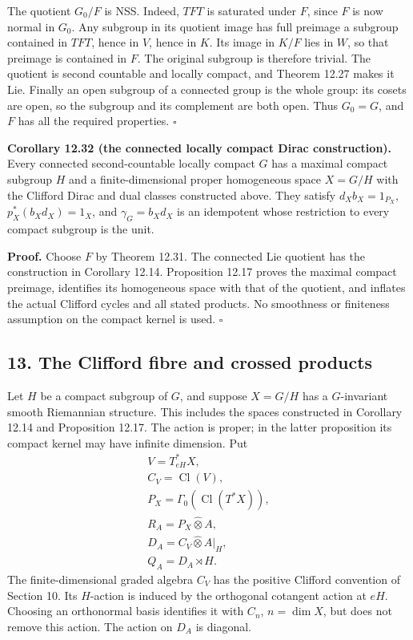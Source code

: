 \documentclass[
  11pt,
]{article}
\begin{document}
The quotient \(G_0/F\) is NSS. Indeed, \(TFT\) is saturated under \(F\),
since \(F\) is now normal in \(G_0\). Any subgroup in its quotient image
has full preimage a subgroup contained in \(TFT\), hence in \(V\), hence
in \(K\). Its image in \(K/F\) lies in \(W\), so that preimage is
contained in \(F\). The original subgroup is therefore trivial. The
quotient is second countable and locally compact, and Theorem 12.27
makes it Lie. Finally an open subgroup of a connected group is the whole
group: its cosets are open, so the subgroup and its complement are both
open. Thus \(G_0=G\), and \(F\) has all the required properties.
\(\square\)

\textbf{Corollary 12.32 (the connected locally compact Dirac
construction).} Every connected second-countable locally compact \(G\)
has a maximal compact subgroup \(H\) and a finite-dimensional proper
homogeneous space \(X=G/H\) with the Clifford Dirac and dual classes
constructed above. They satisfy \(d_Xb_X=1_{P_X}\),
\(p_X^*(b_Xd_X)=1_X\), and \(\gamma_G=b_Xd_X\) is an idempotent whose
restriction to every compact subgroup is the unit.

\textbf{Proof.} Choose \(F\) by Theorem 12.31. The connected Lie
quotient has the construction in Corollary 12.14. Proposition 12.17
proves the maximal compact preimage, identifies its homogeneous space
with that of the quotient, and inflates the actual Clifford cycles and
all stated products. No smoothness or finiteness assumption on the
compact kernel is used. \(\square\)

\subsection{13. The Clifford fibre and crossed
products}\label{the-clifford-fibre-and-crossed-products}

Let \(H\) be a compact subgroup of \(G\), and suppose \(X=G/H\) has a
\(G\)-invariant smooth Riemannian structure. This includes the spaces
constructed in Corollary 12.14 and Proposition 12.17. The action is
proper; in the latter proposition its compact kernel may have infinite
dimension. Put \[
\begin{gathered}
V=T_{eH}^*X,\\
C_V=\operatorname{Cl}(V),\\
P_X=\Gamma_0(\operatorname{Cl}(T^*X)),\\
R_A=P_X\widehat\otimes A,\\
D_A=C_V\widehat\otimes A|_H,\\
Q_A=D_A\rtimes H.
\end{gathered}
\tag{13.1}
\] The finite-dimensional graded algebra \(C_V\) has the positive
Clifford convention of Section 10. Its \(H\)-action is induced by the
orthogonal cotangent action at \(eH\). Choosing an orthonormal basis
identifies it with \(C_n\), \(n=\dim X\), but does not remove this
action. The action on \(D_A\) is diagonal.
\end{document}
